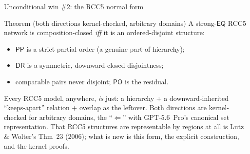 \documentclass[aspectratio=169,11pt]{beamer}
\newcommand{\DR}{\mathsf{DR}}
\newcommand{\PO}{\mathsf{PO}}
\newcommand{\PP}{\mathsf{PP}}
\newcommand{\EQ}{\mathsf{EQ}}
\begin{document}
\begin{frame}{Unconditional win \#2: the RCC5 normal form}
\begin{block}{Theorem (both directions kernel-checked, arbitrary domains)}
  A strong-$\EQ$ RCC5 network is composition-closed \emph{iff} it is an
  \alert{ordered-disjoint structure}:
  \begin{itemize}
    \item $\PP$ is a strict partial order (a genuine part-of hierarchy);
    \item $\DR$ is a symmetric, \alert{downward-closed} disjointness;
    \item comparable pairs never disjoint; $\PO$ is the residual.
  \end{itemize}
\end{block}
\vfill
Every RCC5 model, anywhere, \emph{is} just: a hierarchy + a
downward-inherited ``keeps-apart'' relation + overlap as the leftover.
Both directions are kernel-checked for arbitrary domains, the
``$\Leftarrow$'' with GPT-5.6~Pro's \alert{canonical set representation}.
That RCC5 structures are representable by regions at all is
\alert{Lutz \& Wolter's} Thm~23 (2006); what is new is this form, the
explicit construction, and the kernel proofs.
\end{frame}
\end{document}
